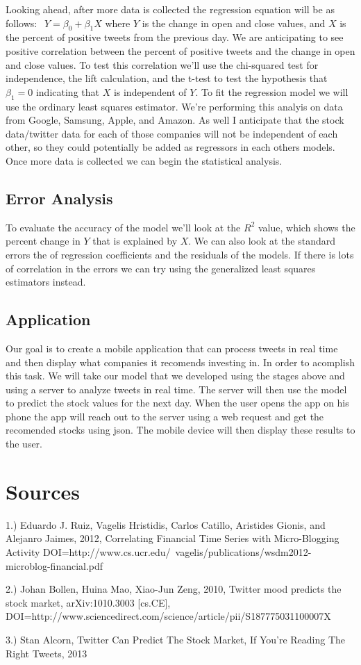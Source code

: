\documentclass{acm_proc_article-sp}
\begin{document}
Looking ahead, after more data is collected the regression equation will be as
follows: $ \ \ Y = \beta_0 + \beta_1X $ where $Y$ is the change in open and
close values, and $X$ is the percent of positive tweets from the previous day.
We are anticipating to see positive correlation between the percent of positive
tweets and the change in open and close values. To test this correlation we'll
use the chi-squared test for independence, the lift calculation, and the t-test
to test the hypothesis that $\beta_1 = 0$ indicating that $X$ is independent of
$Y$. To fit the regression model we will use the ordinary least squares
estimator. We're performing this analyis on data from Google, Samsung, Apple,
and Amazon. As well I anticipate that the stock data/twitter data for each of
those companies will not be independent of each other, so they could
potentially be added as regressors in each others models. Once more data is
collected we can begin the statistical analysis. 

\subsection{Error Analysis}

To evaluate the accuracy of the model we'll look at the $R^2$ value, which
shows the percent change in $Y$ that is explained by $X$. We can also look at
the standard errors the of regression coefficients and the residuals of the
models. If there is lots of correlation in the errors we can try using the
generalized least squares estimators instead. 


\subsection{Application}

Our goal is to create a mobile application that can process tweets in real time
and then display what companies it recomends investing in. In order to
acomplish this task. We will take our model that we developed using the stages
above and using a server to analyze tweets in real time. The server will then
use the model to predict the stock values for the next day. When the user opens
the app on his phone the app will reach out to the server using a web request
and get the recomended stocks using json. The mobile device will then display
these results to the user.

\section{Sources}

1.) Eduardo J. Ruiz, Vagelis Hristidis, Carlos Catillo, Aristides Gionis, and
Alejanro Jaimes,  2012, Correlating Financial Time Series with Micro-Blogging
Activity DOI=http://www.cs.ucr.edu/~vagelis/publications/wsdm2012-microblog-financial.pdf 

2.) Johan Bollen, Huina Mao, Xiao-Jun Zeng, 2010, Twitter mood predicts the stock
market, arXiv:1010.3003 [cs.CE], DOI=http://www.sciencedirect.com/science/article/pii/S187775031100007X


3.) Stan Alcorn, Twitter Can Predict The Stock Market, If You're Reading The Right
Tweets, 2013

 
\end{document}
